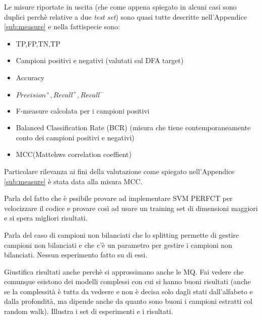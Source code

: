 Le misure riportate in uscita (che come appena spiegato in alcuni casi sono duplici perchè relative a due \textit{test set}) sono quasi tutte descritte nell'Appendice \ref{sub:measure} e nella fattispecie sono:
\begin{itemize}
\item TP,FP,TN,TP
\item Campioni positivi e negativi (valutati sul \ac{DFA} target)
\item Accuracy
\item $Precision^{+},Recall^{+},Recall^{-}$
\item F-measure calcolata per i campioni positivi
\item Balanced Classification Rate (BCR) (misura che tiene contemporaneamente conto dei campioni positivi e negativi)
\item MCC(Mattehws correlation coeffient)
\end{itemize}        
Particolare rilevanza ai fini della valutazione come spiegato nell'Appendice \ref{sub:measure} è stata data  alla misura MCC.
	  





Parla del fatto che è pssibile provare ad implementare SVM PERFCT per velocizzare il codice e provare così ad usare un training set di dimensioni maggiori e si spera migliori risultati.

Parla del caso di campioni non bilanciati che lo splitting permette di gestire campioni non bilanciati e che c'è un parametro per gestire i campioni non bilanciati. Nessun esperimento fatto su di essi.

Giustifica risultati anche perchè si approssimano anche le MQ.
Fai vedere che comunque esistono dei modelli complessi con cui si hanno buoni risultati (anche se la complessità è tutta da vedeere e non è decisa solo dagli stati dall'alfabeto e dalla profondità, ma dipende anche da quanto sono buoni i campioni estratti col random walk).
Illustra i set di esperimenti e i risultati.
